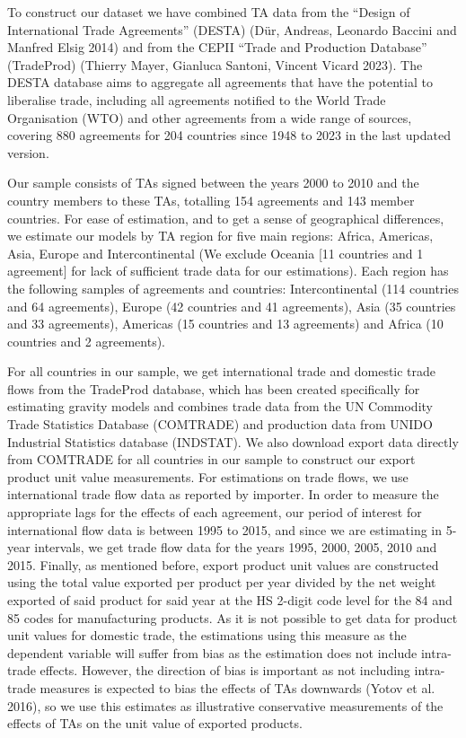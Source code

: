 To construct our dataset we have combined TA data from the ``Design of
International Trade Agreements'' (DESTA) (Dür, Andreas, Leonardo Baccini
and Manfred Elsig 2014) and from the CEPII ``Trade and Production
Database'' (TradeProd) (Thierry Mayer, Gianluca Santoni, Vincent Vicard
2023). The DESTA database aims to aggregate all agreements that have the
potential to liberalise trade, including all agreements notified to the
World Trade Organisation (WTO) and other agreements from a wide range of
sources, covering 880 agreements for 204 countries since 1948 to 2023 in
the last updated version.

Our sample consists of TAs signed between the years 2000 to 2010 and the
country members to these TAs, totalling 154 agreements and 143 member
countries. For ease of estimation, and to get a sense of geographical
differences, we estimate our models by TA region for five main regions:
Africa, Americas, Asia, Europe and Intercontinental (We exclude Oceania
{[}11 countries and 1 agreement{]} for lack of sufficient trade data for
our estimations). Each region has the following samples of agreements
and countries: Intercontinental (114 countries and 64 agreements),
Europe (42 countries and 41 agreements), Asia (35 countries and 33
agreements), Americas (15 countries and 13 agreements) and Africa (10
countries and 2 agreements).

For all countries in our sample, we get international trade and domestic
trade flows from the TradeProd database, which has been created
specifically for estimating gravity models and combines trade data from
the UN Commodity Trade Statistics Database (COMTRADE) and production
data from UNIDO Industrial Statistics database (INDSTAT). We also
download export data directly from COMTRADE for all countries in our
sample to construct our export product unit value measurements. For
estimations on trade flows, we use international trade flow data as
reported by importer. In order to measure the appropriate lags for the
effects of each agreement, our period of interest for international flow
data is between 1995 to 2015, and since we are estimating in 5-year
intervals, we get trade flow data for the years 1995, 2000, 2005, 2010
and 2015. Finally, as mentioned before, export product unit values are
constructed using the total value exported per product per year divided
by the net weight exported of said product for said year at the HS
2-digit code level for the 84 and 85 codes for manufacturing products.
As it is not possible to get data for product unit values for domestic
trade, the estimations using this measure as the dependent variable will
suffer from bias as the estimation does not include intra-trade effects.
However, the direction of bias is important as not including intra-trade
measures is expected to bias the effects of TAs downwards (Yotov et al.
2016), so we use this estimates as illustrative conservative
measurements of the effects of TAs on the unit value of exported
products.
